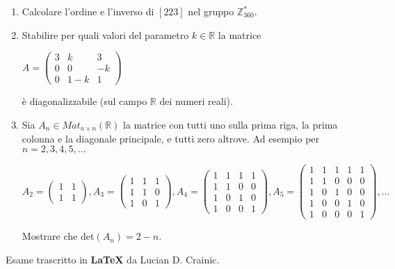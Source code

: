 \documentclass[fleqn]{article}
\begin{document}
\begin{enumerate}
    \item Calcolare l'ordine e l'inverso di $[223]$ nel gruppo $\mathbb{Z}_{360}^*$.
    
    \item Stabilire per quali valori del parametro $k \in \mathbb{R}$ la matrice 
    \begin{center}
    $A = \begin{pmatrix}
          3 & k & 3 \\
          0 & 0 & -k \\
          0 & 1-k & 1 
       \end{pmatrix}$
    \end{center}
    è diagonalizzabile (sul campo $\mathbb{R}$ dei numeri reali).

    \item Sia $A_n \in Mat_{n \times n}(\mathbb{R})$ la matrice con tutti uno sulla prima riga, la prima colonna
    e la diagonale principale, e tutti zero altrove. Ad esempio per $n=2,3,4,5,...$
    \begin{center}
    $
    A_2 = \begin{pmatrix}
          1 & 1 \\
          1 & 1
       \end{pmatrix},
    A_3 = \begin{pmatrix}
        1 & 1 & 1\\
        1 & 1 & 0  \\
        1 & 0 & 1 
     \end{pmatrix},
    A_4 = \begin{pmatrix}
        1 & 1 & 1 & 1\\
        1 & 1 & 0 & 0  \\
        1 & 0 & 1 & 0 \\
        1 & 0 & 0 & 1 
     \end{pmatrix},
    A_5 = \begin{pmatrix}
        1 & 1 & 1 & 1 & 1\\
        1 & 1 & 0 & 0 & 0  \\
        1 & 0 & 1 & 0 & 0 \\
        1 & 0 & 0 & 1 & 0 \\
        1 & 0 & 0 & 0 & 1
     \end{pmatrix},
     ...
    $
    \end{center}
     Mostrare che det$(A_n) = 2-n$.
\end{enumerate}
Esame trascritto in \textbf{\LaTeX} da Lucian D. Crainic.
\end{document}

